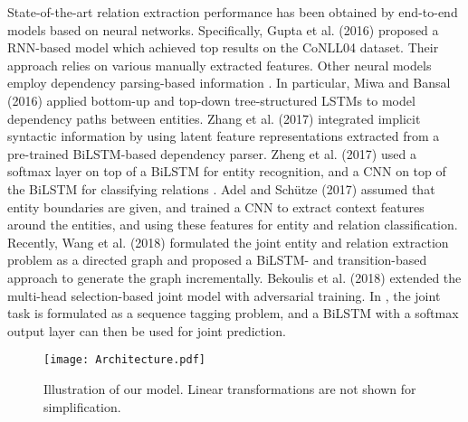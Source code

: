 \documentclass[runningheads]{llncs}
\begin{document}
State-of-the-art relation extraction performance has been obtained by end-to-end models based on neural networks. Specifically, Gupta et al. (2016)  \cite{gupta-schutze-andrassy:2016:COLING} proposed a RNN-based  model which achieved top results on the  CoNLL04 dataset. Their approach 
relies on various manually extracted features. Other neural models  employ  dependency parsing-based information \cite{miwa-bansal:2016:P16-1,pawarEACLlong,zhang-zhang-fu:2017:EMNLP2017}.  
 In particular, Miwa and Bansal (2016) \cite{miwa-bansal:2016:P16-1} applied bottom-up and top-down tree-structured LSTMs to model dependency paths between entities. Zhang et al. (2017) \cite{zhang-zhang-fu:2017:EMNLP2017} integrated implicit syntactic information by using latent feature representations extracted from a pre-trained BiLSTM-based dependency parser.  Zheng et al. (2017) \cite{ZhengHLBXHX17} used a softmax layer on top of a BiLSTM for entity recognition, and a CNN on top of the  BiLSTM for classifying  relations  \cite{Nguyen2016}.   Adel and Sch\"utze (2017) \cite{adel-schutze:2017:EMNLP2017} assumed that entity boundaries are given, and   trained a CNN to  extract context  features around the entities, and using these features  for entity and relation classification.  
Recently, Wang  et al. (2018) \cite{ijcai2018-620} formulated the joint entity and relation extraction problem as a directed graph and proposed a BiLSTM- and transition-based approach to generate the graph incrementally. Bekoulis et al. (2018) \cite{Bekoulis18emnlp}   extended the multi-head selection-based   joint model \cite{BEKOULIS201834} with adversarial training. 
In \cite{BEKOULIS201834,zheng-EtAl:2017:Long,katiyar-cardie:2017:Long}, the joint  task is  formulated as a sequence tagging problem, and  a BiLSTM with a softmax output layer can then be used for joint prediction. 


\begin{figure}[!t]
\centering
\texttt{[image: Architecture.pdf]}
\vspace{-10pt}
\caption{Illustration of our  model. Linear transformations are not shown   for simplification.}
\label{fig:architecture}
\vspace{-5pt}
\end{figure}
\end{document}
